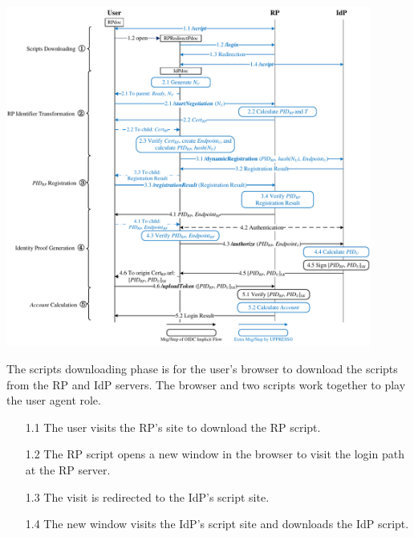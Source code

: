 \begin{strip}
\centering\includegraphics[width=0.9\textwidth]{fig/process-js.pdf}
\label{fig:process}
\vspace{-5mm}
\end{strip}



The scripts downloading phase is for the user's browser to download the scripts from the RP and IdP servers. The browser and two scripts work together to play the user agent role.
\vspace{-\topsep}
\begin{itemize}
\item[1.1] The user visits the RP's site to download the RP script.
\vspace{-\topsep}
\item[1.2] The RP script opens a new window in the browser to visit the login path at the RP server.
\vspace{-\topsep}
\item[1.3] The visit is redirected to the IdP's script site.
\vspace{-\topsep}
\item[1.4] The new window visits the IdP's script site and downloads the IdP script.
\end{itemize}
\vspace{-\topsep}

